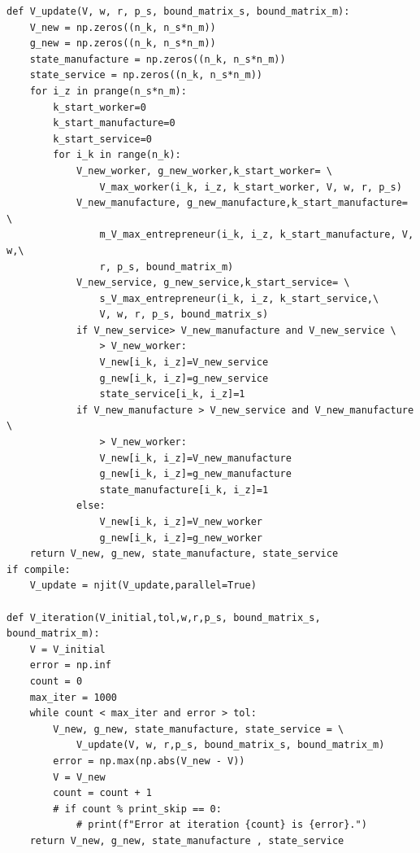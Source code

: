 \documentclass[a4paper, 12pt]{ctexart}
\begin{document}
\begin{lstlisting}
def V_update(V, w, r, p_s, bound_matrix_s, bound_matrix_m):
    V_new = np.zeros((n_k, n_s*n_m))
    g_new = np.zeros((n_k, n_s*n_m))
    state_manufacture = np.zeros((n_k, n_s*n_m))
    state_service = np.zeros((n_k, n_s*n_m))
    for i_z in prange(n_s*n_m):
        k_start_worker=0
        k_start_manufacture=0
        k_start_service=0
        for i_k in range(n_k):
            V_new_worker, g_new_worker,k_start_worker= \
                V_max_worker(i_k, i_z, k_start_worker, V, w, r, p_s)
            V_new_manufacture, g_new_manufacture,k_start_manufacture= \
                m_V_max_entrepreneur(i_k, i_z, k_start_manufacture, V, w,\
                r, p_s, bound_matrix_m)
            V_new_service, g_new_service,k_start_service= \
                s_V_max_entrepreneur(i_k, i_z, k_start_service,\
                V, w, r, p_s, bound_matrix_s)
            if V_new_service> V_new_manufacture and V_new_service \
                > V_new_worker:
                V_new[i_k, i_z]=V_new_service
                g_new[i_k, i_z]=g_new_service
                state_service[i_k, i_z]=1
            if V_new_manufacture > V_new_service and V_new_manufacture \
                > V_new_worker:
                V_new[i_k, i_z]=V_new_manufacture
                g_new[i_k, i_z]=g_new_manufacture
                state_manufacture[i_k, i_z]=1
            else:
                V_new[i_k, i_z]=V_new_worker
                g_new[i_k, i_z]=g_new_worker
    return V_new, g_new, state_manufacture, state_service
if compile:
    V_update = njit(V_update,parallel=True)

def V_iteration(V_initial,tol,w,r,p_s, bound_matrix_s, bound_matrix_m):
    V = V_initial
    error = np.inf
    count = 0
    max_iter = 1000
    while count < max_iter and error > tol:
        V_new, g_new, state_manufacture, state_service = \
            V_update(V, w, r,p_s, bound_matrix_s, bound_matrix_m)
        error = np.max(np.abs(V_new - V))
        V = V_new
        count = count + 1
        # if count % print_skip == 0:
            # print(f"Error at iteration {count} is {error}.")
    return V_new, g_new, state_manufacture , state_service
\end{lstlisting}
\end{document}
